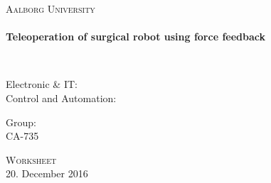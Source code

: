 %


\begin{center}

\vspace*{\fill}

\textsc{\LARGE Aalborg University}\\[1.0cm]

\HRule \\[0.4cm]
{ \HUGE \bfseries  Teleoperation of surgical robot using force feedback \\[0.5cm] }

\HRule \\[1.5cm]%


\begin{minipage}{0.4\textwidth}
\begin{flushleft} \large
Electronic \& IT:\\
Control and Automation:\\
\end{flushleft}
\end{minipage}
\begin{minipage}{0.4\textwidth}
\begin{flushright} \large
Group: \\
CA-735
\end{flushright}
\end{minipage}

\vspace*{\fill}

\textsc{\Large Worksheet}\\[1.0cm]

{\large 20. December 2016}

\end{center}
\newpage